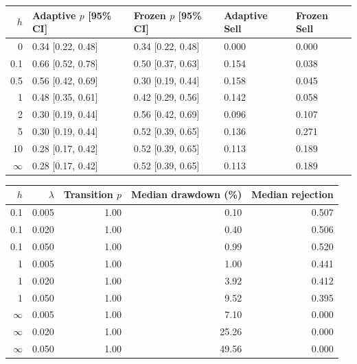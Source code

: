 \begin{center}
\begin{minipage}{\linewidth}\centering
\captionsetup{type=table,hypcap=false}
\caption{Adjusting versus fixed widths of the Hold range at $f=0.175$ over 50 starting markets. Probability brackets are 95\% Wilson confidence intervals (CI). Sell is the mean fraction of technical traders in Sell, averaged over steps after the rule change and starting markets.}
\label{tab:revision-band}
\small
\begin{tabular}{rllll}
\toprule
$h$ & Adaptive $p$ [95\% CI] & Frozen $p$ [95\% CI] & Adaptive Sell & Frozen Sell \\
\midrule
0 & 0.34 [0.22, 0.48] & 0.34 [0.22, 0.48] & 0.000 & 0.000 \\
0.1 & 0.66 [0.52, 0.78] & 0.50 [0.37, 0.63] & 0.154 & 0.038 \\
0.5 & 0.56 [0.42, 0.69] & 0.30 [0.19, 0.44] & 0.158 & 0.045 \\
1 & 0.48 [0.35, 0.61] & 0.42 [0.29, 0.56] & 0.142 & 0.058 \\
2 & 0.30 [0.19, 0.44] & 0.56 [0.42, 0.69] & 0.096 & 0.107 \\
5 & 0.30 [0.19, 0.44] & 0.52 [0.39, 0.65] & 0.136 & 0.271 \\
10 & 0.28 [0.17, 0.42] & 0.52 [0.39, 0.65] & 0.113 & 0.189 \\
$\infty$ & 0.28 [0.17, 0.42] & 0.52 [0.39, 0.65] & 0.113 & 0.189 \\
\bottomrule
\end{tabular}
\end{minipage}
\end{center}

\begin{center}
\begin{minipage}{\linewidth}\centering
\captionsetup{type=table,hypcap=false}
\caption{Changes in how strongly trades affected price at $f=0.20$, with the technical traders active, 50 seeds per cell. Drawdown is a percentage; rejection is the fraction of post-switch eligible orders rejected.}
\label{tab:revision-impact}
\small
\begin{tabular}{rrrrr}
\toprule
$h$ & $\lambda$ & Transition $p$ & Median drawdown (\%) & Median rejection \\
\midrule
0.1 & 0.005 & 1.00 & 0.10 & 0.507 \\
0.1 & 0.020 & 1.00 & 0.40 & 0.506 \\
0.1 & 0.050 & 1.00 & 0.99 & 0.520 \\
1 & 0.005 & 1.00 & 1.00 & 0.441 \\
1 & 0.020 & 1.00 & 3.92 & 0.412 \\
1 & 0.050 & 1.00 & 9.52 & 0.395 \\
$\infty$ & 0.005 & 1.00 & 7.10 & 0.000 \\
$\infty$ & 0.020 & 1.00 & 25.26 & 0.000 \\
$\infty$ & 0.050 & 1.00 & 49.56 & 0.000 \\
\bottomrule
\end{tabular}
\end{minipage}
\end{center}


